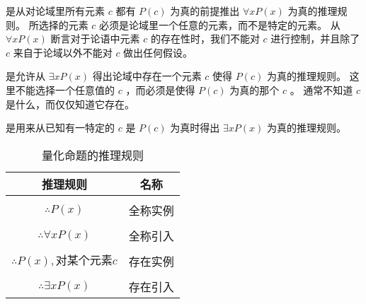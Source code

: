 {{        是从对论域里所有元素 $c$ 都有 $P(c)$ 为真的前提推出 $\forall x P(x)$ 为真的推理规则。
        所选择的元素 $c$ 必须是论域里一个任意的元素，而不是特定的元素。
        从 $\forall x P(x)$ 断言对于论语中元素 $c$ 的存在性时，我们不能对 $c$ 进行控制，并且除了 $c$ 来自于论域以外不能对 $c$ 做出任何假设。

        是允许从 $\exists x P(x)$ 得出论域中存在一个元素 $c$ 使得 $P(c)$ 为真的推理规则。
        这里不能选择一个任意值的 $c$ ，而必须是使得 $P(c)$ 为真的那个 $c$ 。
        通常不知道 $c$ 是什么，而仅仅知道它存在。

        是用来从已知有一特定的 $c$ 是 $P(c)$ 为真时得出 $\exists x P(x)$ 为真的推理规则。

        \begin{table}[htb]
            \centering

            \begin{tabular}{c|c}
                \hline
                推理规则 & 名称 \\
                \hline
                \makecell{$\underline{\forall x P(x)}$ \\ $\therefore P(x)$} & 全称实例 \\
                \hline
                \makecell{$\underline{P(c), \text{任意}c}$ \\ $\therefore \forall x P(x)$} & 全称引入 \\
                \hline
                \makecell{$\underline{\exists x P(x)}$ \\ $\therefore P(x), \text{对某个元素}c$} & 存在实例 \\
                \hline
                \makecell{$\underline{P(x), \text{对某个元素}c}$ \\ $\therefore \exists x P(x)$} & 存在引入 \\
                \hline
            \end{tabular}

            \caption{量化命题的推理规则}
        \end{table}
    }
}
